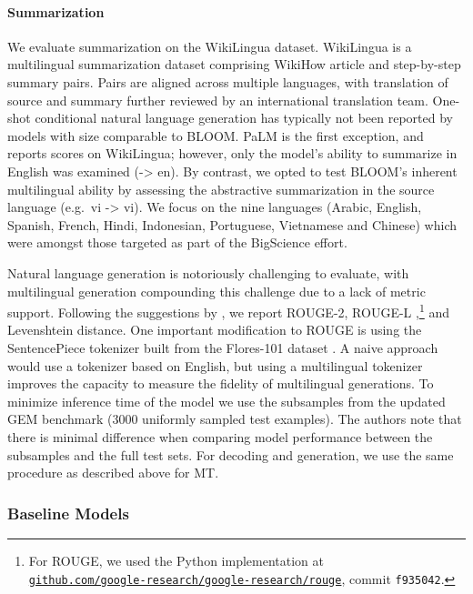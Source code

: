 \documentclass[twoside,11pt]{article}
\begin{document}
\paragraph{Summarization} We evaluate summarization on the WikiLingua \citep{ladhak-etal-2020-wikilingua} dataset. WikiLingua is a multilingual summarization dataset comprising WikiHow article and step-by-step summary pairs. Pairs are aligned across multiple languages, with translation of source and summary further reviewed by an international translation team. One-shot conditional natural language generation has typically not been reported by models with size comparable to BLOOM. PaLM \citep{chowdhery2022palm} is the first exception, and reports scores on WikiLingua; however, only the model's ability to summarize in English was examined (-> en). By contrast, we opted to test BLOOM's inherent multilingual ability by assessing the abstractive summarization in the source language (e.g.~vi -> vi). We focus on the nine 
languages (Arabic, English, Spanish, French, Hindi, Indonesian, Portuguese, Vietnamese and Chinese) which were amongst those targeted as part of the BigScience effort. 

Natural language generation is notoriously challenging to evaluate, with multilingual generation compounding this challenge due to a lack of metric support. Following the suggestions by \citet{gehrmann_cracked}, we report ROUGE-2, ROUGE-L \citep{lin-2004-rouge},\footnote{For ROUGE, we used the Python implementation at\\ \href{https://github.com/google-research/google-research/tree/master/rouge}{\texttt{github.com/google-research/google-research/rouge}}, commit \texttt{f935042}.} and Levenshtein distance. One important modification to ROUGE is using the SentencePiece tokenizer \citep{kudo-richardson-2018-sentencepiece} built from the Flores-101 dataset \citep{goyal-etal-2022-flores}.
A naive approach would use a tokenizer based on English, but using a multilingual tokenizer improves the capacity to measure the fidelity of multilingual generations. To minimize inference time of the model we use the subsamples from the updated GEM benchmark \citep{gemv2} (3000 uniformly sampled test examples).
The authors note that there is minimal difference when comparing model performance between the subsamples and the full test sets.
For decoding and generation, we use the same procedure as described above for MT.

\subsubsection{Baseline Models}
\end{document}
